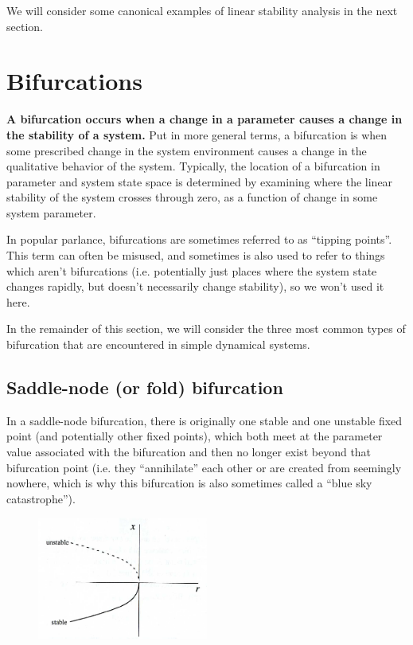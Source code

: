 \documentclass[12pt]{article}
\theoremstyle{definition}
\begin{document}
We will consider some canonical examples of linear stability analysis in the next section.

\section{Bifurcations}
\textbf{A bifurcation occurs when a change in a parameter causes a change in the stability of a system.} Put in more general terms, a bifurcation is when some prescribed change in the system environment causes a change in the qualitative behavior of the system. Typically, the location of a bifurcation in parameter and system state space is determined by examining where the linear stability of the system crosses through zero, as a function of change in some system parameter. 

In popular parlance, bifurcations are sometimes referred to as ``tipping points''. This term can often be misused, and sometimes is also used to refer to things which aren't bifurcations (i.e. potentially just places where the system state changes rapidly, but doesn't necessarily change stability), so we won't used it here.

In the remainder of this section, we will consider the three most common types of bifurcation that are encountered in simple dynamical systems.

\subsection{Saddle-node (or fold) bifurcation}
In a saddle-node bifurcation, there is originally one stable and one unstable fixed point (and potentially other fixed points), which both meet at the parameter value associated with the bifurcation and then no longer exist beyond that bifurcation point (i.e. they ``annihilate'' each other or are created from seemingly nowhere, which is why this bifurcation is also sometimes called a ``blue sky catastrophe'').

\begin{figure}[h]
  \begin{center}
\includegraphics[width=0.5\textwidth]{Saddle_node_bifurcation_diagram.png}
  \end{center}
\end{figure}
\end{document}
